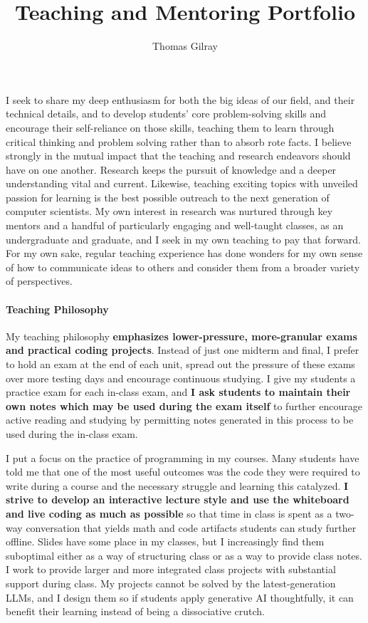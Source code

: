 \documentclass[12pt]{article}
\begin{document}
\title{Teaching and Mentoring Portfolio}
\author{Thomas Gilray}
\date{}
\maketitle
\vspace{-1.25cm}
\small

I seek to share my deep enthusiasm for both the big ideas of our field, and their technical details, and to develop students' core problem-solving skills and encourage their self-reliance on those skills, teaching them to learn through critical thinking and problem solving rather than to absorb rote facts.
I believe strongly in the mutual impact that the teaching and research endeavors should have on one another.
Research keeps the pursuit of knowledge and a deeper understanding vital and current.
Likewise, teaching exciting topics with unveiled passion for learning is the best possible outreach to the next generation of computer scientists. My own interest in research was nurtured through key mentors and a handful of particularly engaging and well-taught classes,
as an undergraduate and graduate, and I seek in my own teaching to pay that forward. For my own sake, regular teaching experience has done wonders for my own
sense of how to communicate ideas to others and consider them from a broader variety of perspectives. 



\paragraph{Teaching Philosophy}

My teaching philosophy \textbf{emphasizes lower-pressure, more-granular exams and practical coding projects}. Instead of just one midterm and final, I prefer to hold an exam at the end of each unit, spread out the pressure of these exams over more testing days and encourage continuous studying. I give my students a practice exam for each in-class exam, and \textbf{I ask students to maintain their own notes which may be used during the exam itself} to further encourage active reading and studying by permitting notes generated in this process to be used during the in-class exam.

I put a focus on the practice of programming in my courses. Many students have told me that one of the most useful outcomes was the code they were required to write during a course and the necessary struggle and learning this catalyzed. \textbf{I strive to develop an interactive lecture style and use the whiteboard and live coding as much as possible} so that time in class is spent as a two-way conversation that yields math and code artifacts students can study further offline. Slides have some place in my classes, but I increasingly find them suboptimal either as a way of structuring class or as a way to provide class notes. I work to provide larger and more integrated class projects with substantial support during class. My projects cannot be solved by the latest-generation LLMs, and I design them so if students apply generative AI thoughtfully, it can benefit their learning instead of being a dissociative crutch.
\end{document}
